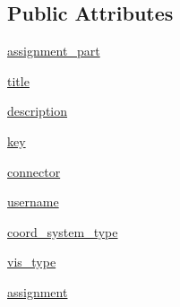 \subsection*{Public Attributes}
\begin{DoxyCompactItemize}
\item 
\hyperlink{class_bridges_1_1bridges_1_1_bridges_aab0a68541bf63b6c234c50514f1cbe80}{assignment\+\_\+part}
\item 
\hyperlink{class_bridges_1_1bridges_1_1_bridges_a5427643899fb1ddfc7d4d834779409bd}{title}
\item 
\hyperlink{class_bridges_1_1bridges_1_1_bridges_adf7716495f589eef1236200869f22679}{description}
\item 
\hyperlink{class_bridges_1_1bridges_1_1_bridges_a0ec63234eea5146e87f0572972a7f41d}{key}
\item 
\hyperlink{class_bridges_1_1bridges_1_1_bridges_a178b38dd8e06bcd4e57527301454ba12}{connector}
\item 
\hyperlink{class_bridges_1_1bridges_1_1_bridges_afe26b5521aae689055377e6f2e6a7212}{username}
\item 
\hyperlink{class_bridges_1_1bridges_1_1_bridges_ae5c5349721fdc457fcae13ed370ba1d8}{coord\+\_\+system\+\_\+type}
\item 
\hyperlink{class_bridges_1_1bridges_1_1_bridges_a0c3729b756ec663959e99210d986638e}{vis\+\_\+type}
\item 
\hyperlink{class_bridges_1_1bridges_1_1_bridges_a66e278ddefd9a2c94c01eb0fc9bbc568}{assignment}
\end{DoxyCompactItemize}
